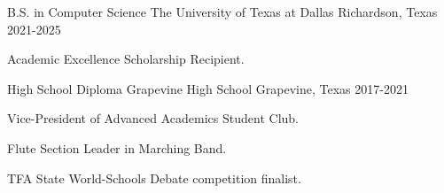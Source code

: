 
\begin{cventries}

\cventry
{B.S. in Computer Science}
{The University of Texas at Dallas}
{Richardson, Texas}
{2021-2025}
{
\begin{cvitems}
\item {Academic Excellence Scholarship Recipient.}
\end{cvitems}
}

\cventry
{High School Diploma}
{Grapevine High School}
{Grapevine, Texas}
{2017-2021}
{
\begin{cvitems}
\item {Vice-President of Advanced Academics Student Club.}
\item {Flute Section Leader in Marching Band.}
\item {TFA State World-Schools Debate competition finalist.}
\end{cvitems}
}


\end{cventries}

